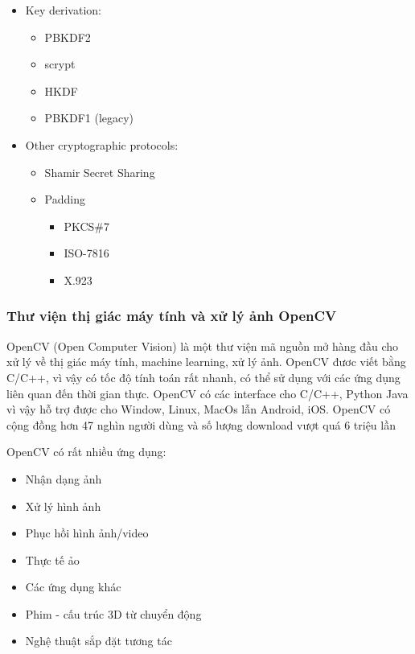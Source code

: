 \documentclass{article}
\begin{document}
\begin{itemize}
\item Key derivation:
\begin{itemize}
    \item PBKDF2
    \item scrypt
    \item HKDF
    \item PBKDF1 (legacy)
\end{itemize}

\item Other cryptographic protocols:
\begin{itemize}
    \item Shamir Secret Sharing
    \item Padding
    \begin{itemize}
        \item PKCS\#7
        \item ISO-7816
        \item X.923
    \end{itemize}
\end{itemize}
\end{itemize}

\subsubsection{Thư viện thị giác máy tính và xử lý ảnh OpenCV}

OpenCV (Open Computer Vision) là một thư viện mã nguồn mở hàng đầu cho xử lý về thị giác máy tính, machine learning, xử lý ảnh. OpenCV đươc viết bằng C/C++, vì vậy có tốc độ tính toán rất nhanh, có thể sử dụng với các ứng dụng liên quan đến thời gian thực. OpenCV có các interface cho C/C++, Python Java vì vậy hỗ trợ được cho Window, Linux, MacOs lẫn Android, iOS. OpenCV có cộng đồng hơn 47 nghìn người dùng và số lượng download vượt quá 6 triệu lần

OpenCV có rất nhiều ứng dụng:

\begin{itemize}
    \item Nhận dạng ảnh
    \item Xử lý hình ảnh
    \item Phục hồi hình ảnh/video
    \item Thực tế ảo
    \item Các ứng dụng khác
    \item Phim - cấu trúc 3D từ chuyển động
    \item Nghệ thuật sắp đặt tương tác
\end{itemize}
\end{document}
